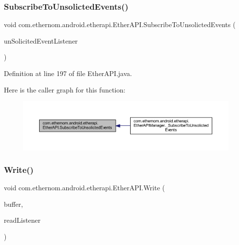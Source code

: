 \subsubsection{\texorpdfstring{Subscribe\+To\+Unsolicted\+Events()}{SubscribeToUnsolictedEvents()}}
{\footnotesize\ttfamily void com.\+ethernom.\+android.\+etherapi.\+Ether\+A\+P\+I.\+Subscribe\+To\+Unsolicted\+Events (\begin{DoxyParamCaption}\item[{final \mbox{\hyperlink{interfacecom_1_1ethernom_1_1android_1_1etherapi_1_1_un_solicited_event_listener}{Un\+Solicited\+Event\+Listener}}}]{un\+Solicited\+Event\+Listener }\end{DoxyParamCaption})}



Definition at line 197 of file Ether\+A\+P\+I.\+java.

Here is the caller graph for this function\+:\nopagebreak
\begin{figure}[H]
\begin{center}
\leavevmode
\includegraphics[width=350pt]{classcom_1_1ethernom_1_1android_1_1etherapi_1_1_ether_a_p_i_a730f9d502afbbb8788aada1bf4ae4381_icgraph}
\end{center}
\end{figure}
\mbox{\label{classcom_1_1ethernom_1_1android_1_1etherapi_1_1_ether_a_p_i_a00dfeb101d51c8b28b2f11d7bdf5f84c}} 
\subsubsection{\texorpdfstring{Write()}{Write()}\hspace{0.1cm}{\footnotesize\ttfamily [1/6]}}
{\footnotesize\ttfamily void com.\+ethernom.\+android.\+etherapi.\+Ether\+A\+P\+I.\+Write (\begin{DoxyParamCaption}\item[{byte \mbox{[}$\,$\mbox{]}}]{buffer,  }\item[{final \mbox{\hyperlink{interfacecom_1_1ethernom_1_1android_1_1etherapi_1_1_read_listener}{Read\+Listener}}}]{read\+Listener }\end{DoxyParamCaption})}



